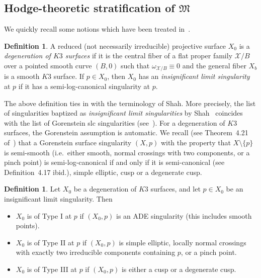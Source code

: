 \documentclass[11pt]{amsart}
\numberwithin{equation}{section}
\theoremstyle{plain}
\theoremstyle{remark}
\theoremstyle{definition}
\newtheorem{definition}[theorem]{Definition}
\newcommand{\sX}{\mathscr{X}}
\newcommand{\gM}{\mathfrak{M}}
\begin{document}
\subsection{Hodge-theoretic stratification of $\gM$}
%
We quickly recall some notions which have been treated in~\cite{log2}.
%
 \begin{definition}\label{dfn:definsignificant}
%
A reduced  (not necessarily irreducible)  projective surface $X_0$ is a \emph{degeneration of $K3$ surfaces} if it is the central fiber of a flat proper family $\sX/B$ over a pointed smooth curve $(B,0)$  such that $\omega_{\sX/B}\equiv 0$ and the general fiber $X_b$ is a smooth $K3$ surface. 
If $p\in X_0$, then  $X_0$ has an \emph{insignificant limit singularity} at $p$ if it has a semi-log-canonical singularity at $p$.
 \end{definition}
%
The above definition ties in with the terminology of Shah. More precisely, the list of singularities baptized as \emph{insignificant limit singularities} by Shah~\cite{shahinsignificant} coincides with the list of Gorenstein slc singularities (see~\cite{sbnef,ksb}). For a degeneration of $K3$ surfaces, the Gorenstein assumption is automatic. We recall (see Theorem~4.21 of~\cite{ksb})  that a Gorenstein surface singularity $(X,p)$ with the property that $X\setminus\{p\}$ is semi-smooth (i.e.~either smooth, normal crossings with two components, or a pinch point) is  semi-log-canonical if and only if it is semi-canonical (see Definition~4.17 ibid.), simple elliptic, cusp or a degenerate cusp. 
%
\begin{definition}\label{dfn:cavalier}
%
Let $X_0$ be a degeneration of $K3$ surfaces, and let $p\in X_0$ be an  insignificant limit singularity. Then  
%
\begin{itemize}
%
\item[i)]  $X_0$ is of Type I at $p$ if $(X_0,p)$ is an ADE singularity (this includes smooth points).
%
\item[ii)]   $X_0$ is of Type II at $p$ if  $(X_0,p)$ is  simple elliptic, locally normal crossings with exactly two irreducible components containing $p$, or  a pinch point. 
%
\item[iii)] $X_0$ is of Type III  at $p$ if   $(X_0,p)$ is either a cusp or a degenerate cusp.
% 
\end{itemize}
\end{definition}
%
%
\end{document}
